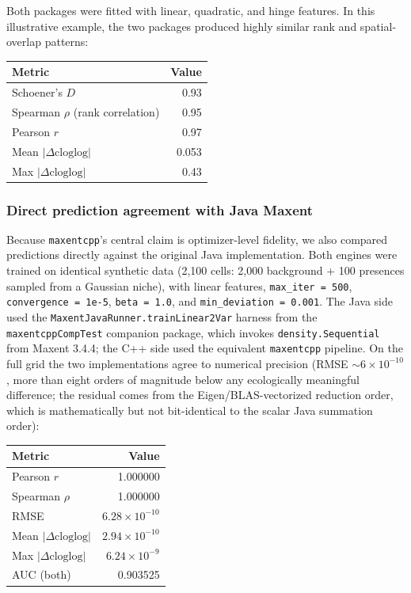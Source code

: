 \documentclass[10pt,letterpaper]{article}
\newcounter{none} %
\begin{document}
Both packages were fitted with linear, quadratic, and hinge features. In
this illustrative example, the two packages produced highly similar rank
and spatial-overlap patterns:

{\def\LTcaptype{none} %
\begin{longtable}[]{@{}lr@{}}
\toprule\noalign{}
Metric & Value \\
\midrule\noalign{}
\endhead
\bottomrule\noalign{}
\endlastfoot
Schoener's \(D\) \cite{Schoener1968,Warren2008} & 0.93 \\
Spearman \(\rho\) (rank correlation) & 0.95 \\
Pearson \(r\) & 0.97 \\
Mean \(\lvert\Delta\text{cloglog}\rvert\) & 0.053 \\
Max \(\lvert\Delta\text{cloglog}\rvert\) & 0.43 \\
\end{longtable}
}

\subsubsection*{Direct prediction agreement with Java
Maxent}

Because \texttt{maxentcpp}'s central claim is optimizer-level fidelity,
we also compared predictions directly against the original Java
implementation. Both engines were trained on identical synthetic data
(2,100 cells: 2,000 background + 100 presences sampled from a Gaussian
niche), with linear features, \texttt{max\_iter\ =\ 500},
\texttt{convergence\ =\ 1e-5}, \texttt{beta\ =\ 1.0}, and
\texttt{min\_deviation\ =\ 0.001}. The Java side used the
\texttt{MaxentJavaRunner.trainLinear2Var} harness from the
\texttt{maxentcppCompTest} companion package, which invokes
\texttt{density.Sequential} from Maxent 3.4.4; the C++ side used the
equivalent \texttt{maxentcpp} pipeline. On the full grid the two
implementations agree to numerical precision (RMSE
\(\sim 6 \times 10^{-10}\), more than eight orders of magnitude below
any ecologically meaningful difference; the residual comes from the
Eigen/BLAS-vectorized reduction order, which is mathematically but not
bit-identical to the scalar Java summation order):

{\def\LTcaptype{none} %
\begin{longtable}[]{@{}lr@{}}
\toprule\noalign{}
Metric & Value \\
\midrule\noalign{}
\endhead
\bottomrule\noalign{}
\endlastfoot
Pearson \(r\) & 1.000000 \\
Spearman \(\rho\) & 1.000000 \\
RMSE & \(6.28 \times 10^{-10}\) \\
Mean \(\lvert\Delta\text{cloglog}\rvert\) & \(2.94 \times 10^{-10}\) \\
Max \(\lvert\Delta\text{cloglog}\rvert\) & \(6.24 \times 10^{-9}\) \\
AUC (both) & 0.903525 \\
\end{longtable}
}
\end{document}
